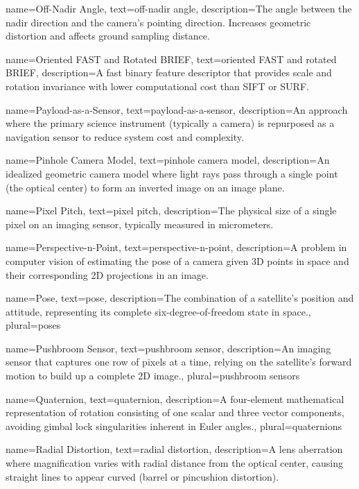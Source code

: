 {
	name=Off-Nadir Angle,
	text=off-nadir angle,
	description={The angle between the nadir direction and the camera's pointing direction. Increases geometric distortion and affects ground sampling distance.}
}

{
	name=Oriented FAST and Rotated BRIEF,
	text=oriented FAST and rotated BRIEF,
	description={A fast binary feature descriptor that provides scale and rotation invariance with lower computational cost than SIFT or SURF.}
}

{
	name=Payload-as-a-Sensor,
	text=payload-as-a-sensor,
	description={An approach where the primary science instrument (typically a camera) is repurposed as a navigation sensor to reduce system cost and complexity.}
}

{
	name=Pinhole Camera Model,
	text=pinhole camera model,
	description={An idealized geometric camera model where light rays pass through a single point (the optical center) to form an inverted image on an image plane.}
}

{
	name=Pixel Pitch,
	text=pixel pitch,
	description={The physical size of a single pixel on an imaging sensor, typically measured in micrometers.}
}

{
	name=Perspective-n-Point,
	text=perspective-n-point,
	description={A problem in computer vision of estimating the pose of a camera given 3D points in space and their corresponding 2D projections in an image.}
}

{
	name=Pose,
	text=pose,
	description={The combination of a satellite's position and attitude, representing its complete six-degree-of-freedom state in space.},
	plural=poses
}

{
	name=Pushbroom Sensor,
	text=pushbroom sensor,
	description={An imaging sensor that captures one row of pixels at a time, relying on the satellite's forward motion to build up a complete 2D image.},
	plural=pushbroom sensors
}

{
	name=Quaternion,
	text=quaternion,
	description={A four-element mathematical representation of rotation consisting of one scalar and three vector components, avoiding gimbal lock singularities inherent in Euler angles.},
	plural=quaternions
}

{
	name=Radial Distortion,
	text=radial distortion,
	description={A lens aberration where magnification varies with radial distance from the optical center, causing straight lines to appear curved (barrel or pincushion distortion).}
}

